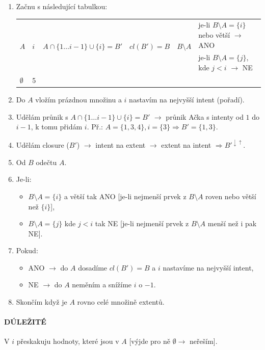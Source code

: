 \begin{enumerate}
\item Začnu s následující tabulkou:
\begin{table}[H]
	\centering
	\label{my-label}
	\begin{tabular}{l|l|l|l|l|p{6cm}}
		\multirow{2}{*}{$ A $} & \multirow{2}{*}{$ i $} & \multirow{2}{*}{$ A \cap \{1 \ldots i - 1\} \cup \{i\} = B' $ } & \multirow{2}{*}{$ cl(B') = B $ } & \multirow{2}{*}{$B \setminus A $  } & je-li $B \setminus A = \{i\}$ nebo větší $\rightarrow$ ANO  \\
		&                   &                   &                   &                   & je-li $B \setminus A = \{j\}$, kde $j < i$ $\rightarrow$ NE \\\hhline
		$\emptyset$ & 5  &  &  &  & 
	\end{tabular}
\end{table}
\item Do $A$ vložím prázdnou množinu a $i$ nastavím na nejvyšší intent (pořadí).
\item Udělám průnik s $A \cap \{1 \ldots i - 1\} \cup \{i\} = B'$ $\rightarrow$ průnik Ačka s intenty od $ 1 $ do $ i-1 $, k tomu přidám $i$. Př.: $A = \{1, 3, 4\}, i = \{3\} \Rightarrow B' = \{1, 3\}$.
\item Udělám closure ($B'$) $\rightarrow$ intent na extent $\rightarrow$ extent na intent $\Rightarrow B'^{\downarrow \uparrow}$.
\item Od $B$ odečtu $A$.
\item Je-li:
\begin{itemize}
\item $B \setminus A = \{i\}$ a větší tak ANO [je-li nejmenší prvek z $B \setminus A$ roven nebo větší než $\{i\}$],
\item $B \setminus A = \{j\}$ kde $j < i$ tak NE [je-li nejmenší prvek z $B \setminus A$ menší než i pak NE].
\end{itemize}
\item Pokud:
\begin{itemize}
\item ANO $\rightarrow$ do $A$ dosadíme $cl(B') = B$ a $i$ nastavíme na nejvyšší intent,
\item NE $\rightarrow$ do $A$ neměním a snížíme $i$ o $-1$.
\end{itemize}
\item Skončím když je $A$ rovno celé množině extentů.
\end{enumerate}

\paragraph{DÚLEŽITÉ} V $i$ přeskakuju hodnoty, které jsou v $A$ [výjde pro ně $\emptyset \rightarrow$ neřeším].


